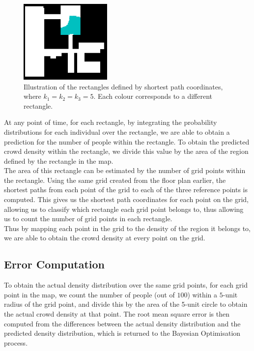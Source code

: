 \documentclass[letterpaper]{article}
\begin{document}
\begin{figure}[!h]
  \centering
    \includegraphics[width=170px]{diagrams/spsinglerectangle.png}
  \caption{Illustration of the rectangles defined by shortest path coordinates, where $k_1 = k_2 = k_3 = 5$. Each colour corresponds to a different rectangle.}
  \label{fig:sprectangles}
\end{figure}

At any point of time, for each rectangle, by integrating the probability distributions for each individual over the rectangle, we are able to obtain a prediction for the number of people within the rectangle. To obtain the predicted crowd density within the rectangle, we divide this value by the area of the region defined by the rectangle in the map.\\

The area of this rectangle can be estimated by the number of grid points within the rectangle. Using the same grid created from the floor plan earlier, the shortest paths from each point of the grid to each of the three reference points is computed. This gives us the shortest path coordinates for each point on the grid, allowing us to classify which rectangle each grid point belongs to, thus allowing us to count the number of grid points in each rectangle. \\

Thus by mapping each point in the grid to the density of the region it belongs to, we are able to obtain the crowd density at every point on the grid.

\subsection{Error Computation}

To obtain the actual density distribution over the same grid points, for each grid point in the map, we count the number of people (out of $100$) within a $5$-unit radius of the grid point, and divide this by the area of the 5-unit circle to obtain the actual crowd density at that point. The root mean square error is then computed from the differences between the actual density distribution and the predicted density distribution, which is returned to the Bayesian Optimisation process. \\
\end{document}
